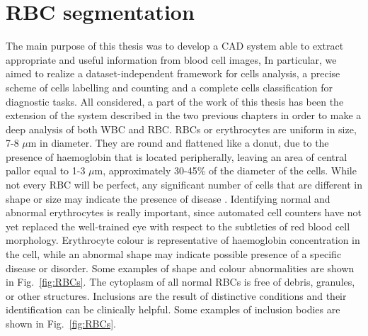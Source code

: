 \documentclass[final,a4paper,12pt,english]{UnicaPhdThesis3}
\begin{document}
\section{RBC segmentation}
The main purpose of this thesis was to develop a CAD system able to extract appropriate and useful information from blood cell images, In particular, we aimed to realize a dataset-independent framework for cells analysis, a precise scheme of cells labelling and counting and a complete cells classification for diagnostic tasks. All considered, a part of the work of this thesis has been the extension of the system described in the two previous chapters in order to make a deep analysis of both WBC and RBC.
RBCs or erythrocytes are uniform in size, 7-8 $\mu$m in diameter. They are round and flattened like a donut, due to the presence of haemoglobin that is located peripherally, leaving an area of central pallor equal to 1-3 $\mu$m, approximately 30-45\% of the diameter of the cells. While not every RBC will be perfect, any significant number of cells that are different in shape or size may indicate the presence of disease \cite{Erhabor}. Identifying normal and abnormal erythrocytes is really important, since automated cell counters have not yet replaced the well-trained eye with respect to the subtleties of red blood cell morphology. Erythrocyte colour is representative of haemoglobin concentration in the cell, while an abnormal shape may indicate possible presence of a specific disease or disorder. Some examples of shape and colour abnormalities are shown in Fig.~\ref{fig:RBCs}. The cytoplasm of all normal RBCs is free of debris, granules, or other structures. Inclusions are the result of distinctive conditions and their identification can be clinically helpful. Some examples of inclusion bodies are shown in Fig.~\ref{fig:RBCs}.
\end{document}
